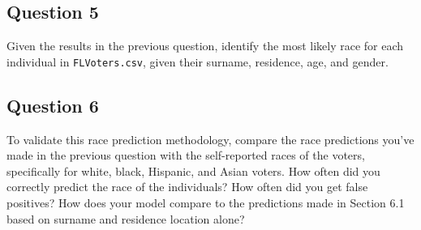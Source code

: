 \documentclass[]{article}
\begin{document}
\subsection{Question 5}\label{question-5}

Given the results in the previous question, identify the most likely
race for each individual in \texttt{FLVoters.csv}, given their surname,
residence, age, and gender.

\subsection{Question 6}\label{question-6}

To validate this race prediction methodology, compare the race
predictions you've made in the previous question with the self-reported
races of the voters, specifically for white, black, Hispanic, and Asian
voters. How often did you correctly predict the race of the individuals?
How often did you get false positives? How does your model compare to
the predictions made in Section 6.1 based on surname and residence
location alone?
\end{document}
